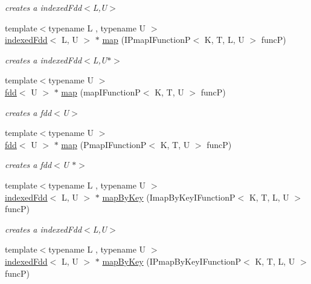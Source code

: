 \begin{DoxyCompactItemize}
\begin{DoxyCompactList}\small\item\em creates a indexed\+Fdd$<$\+L,\+U$>$ \end{DoxyCompactList}\item 
{\footnotesize template$<$typename L , typename U $>$ }\\\hyperlink{classfaster_1_1indexedFdd}{indexed\+Fdd}$<$ L, U $>$ $\ast$ \hyperlink{group__map_ga419f8dacfdbeb5f4d6d48e1c7a352fd8}{map} (I\+Pmap\+I\+FunctionP$<$ K, T, L, U $>$ funcP)
\begin{DoxyCompactList}\small\item\em creates a indexed\+Fdd$<$\+L,\+U$\ast$$>$ \end{DoxyCompactList}\item 
{\footnotesize template$<$typename U $>$ }\\\hyperlink{classfaster_1_1fdd}{fdd}$<$ U $>$ $\ast$ \hyperlink{group__map_ga9f6dad86bb02ecef29cf051609b50e37}{map} (map\+I\+FunctionP$<$ K, T, U $>$ funcP)
\begin{DoxyCompactList}\small\item\em creates a fdd$<$\+U$>$ \end{DoxyCompactList}\item 
{\footnotesize template$<$typename U $>$ }\\\hyperlink{classfaster_1_1fdd}{fdd}$<$ U $>$ $\ast$ \hyperlink{group__map_ga0c5c85eebcf016fdc39b7a52f1b965e1}{map} (Pmap\+I\+FunctionP$<$ K, T, U $>$ funcP)
\begin{DoxyCompactList}\small\item\em creates a fdd$<$\+U $\ast$$>$ \end{DoxyCompactList}\item 
{\footnotesize template$<$typename L , typename U $>$ }\\\hyperlink{classfaster_1_1indexedFdd}{indexed\+Fdd}$<$ L, U $>$ $\ast$ \hyperlink{group__bykey_ga72e66cd0a1896a9ba95e093ea665e5f9}{map\+By\+Key} (Imap\+By\+Key\+I\+FunctionP$<$ K, T, L, U $>$ funcP)
\begin{DoxyCompactList}\small\item\em creates a indexed\+Fdd$<$\+L,\+U$>$ \end{DoxyCompactList}\item 
{\footnotesize template$<$typename L , typename U $>$ }\\\hyperlink{classfaster_1_1indexedFdd}{indexed\+Fdd}$<$ L, U $>$ $\ast$ \hyperlink{group__bykey_gac1f7ce69086373cc5b419da1f8213bdd}{map\+By\+Key} (I\+Pmap\+By\+Key\+I\+FunctionP$<$ K, T, L, U $>$ funcP)

\end{DoxyCompactItemize}
